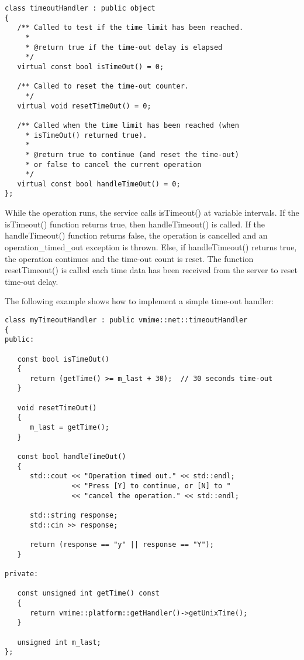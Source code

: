 \begin{lstlisting}
class timeoutHandler : public object
{
   /** Called to test if the time limit has been reached.
     *
     * @return true if the time-out delay is elapsed
     */
   virtual const bool isTimeOut() = 0;

   /** Called to reset the time-out counter.
     */
   virtual void resetTimeOut() = 0;

   /** Called when the time limit has been reached (when
     * isTimeOut() returned true).
     *
     * @return true to continue (and reset the time-out)
     * or false to cancel the current operation
     */
   virtual const bool handleTimeOut() = 0;
};
\end{lstlisting}

While the operation runs, the service calls {\vcode isTimeout()} at variable
intervals. If the {\vcode isTimeout()} function returns {\vcode true},
then {\vcode handleTimeout()} is called. If the {\vcode handleTimeout()}
function returns {\vcode false}, the operation is cancelled and
an {\vcode operation\_timed\_out} exception is thrown. Else, if
{\vcode handleTimeout()} returns true, the operation continues and the
time-out count is reset.
The function {\vcode resetTimeout()} is called each time data has
been received from the server to reset time-out delay.

The following example shows how to implement a simple time-out handler:

\begin{lstlisting}[caption={Implementing a simple time-out handler}]
class myTimeoutHandler : public vmime::net::timeoutHandler
{
public:

   const bool isTimeOut()
   {
      return (getTime() >= m_last + 30);  // 30 seconds time-out
   }

   void resetTimeOut()
   {
      m_last = getTime();
   }

   const bool handleTimeOut()
   {
      std::cout << "Operation timed out." << std::endl;
                << "Press [Y] to continue, or [N] to "
                << "cancel the operation." << std::endl;

      std::string response;
      std::cin >> response;

      return (response == "y" || response == "Y");
   }

private:

   const unsigned int getTime() const
   {
      return vmime::platform::getHandler()->getUnixTime();
   }

   unsigned int m_last;
};
\end{lstlisting}

